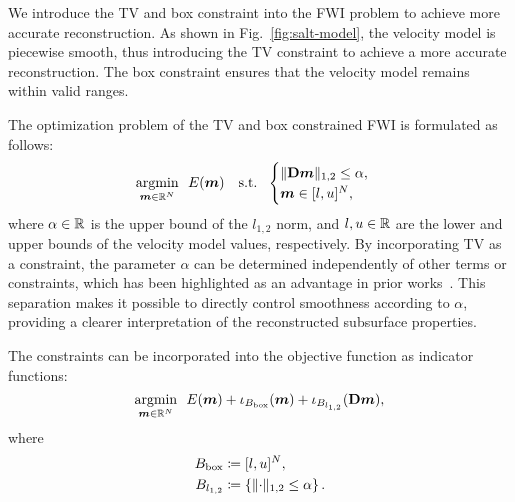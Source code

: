

We introduce the TV and box constraint into the FWI problem to achieve more accurate reconstruction.
As shown in Fig.~\ref{fig:salt-model}, the velocity model is piecewise smooth, thus introducing the TV constraint to achieve a more accurate reconstruction.
The box constraint ensures that the velocity model remains within valid ranges.

The optimization problem of the TV and box constrained FWI is formulated as follows:
\begin{equation} \label{eq:FWIObjectiveWithTVConstraint} \argmin{\velModel \in \realNumber^N} \ \ \FWIObjectiveWithTVConstraint \end{equation}
where $\alpha \in \mathbb{R}$ is the upper bound of the $l_{1,2}$ norm, and $l, u \in \mathbb{R}$ are the lower and upper bounds of the velocity model values, respectively.
By incorporating TV as a constraint, the parameter $\alpha$ can be determined independently of other terms or constraints, which has been highlighted as an advantage in prior works~\cite{constraint0,constraint1,constraint2,constraint3,constraint4,constraints-vs-penalties-in-FWI}.
This separation makes it possible to directly control smoothness according to $\alpha$, providing a clearer interpretation of the reconstructed subsurface properties.

The constraints can be incorporated into the objective function as indicator functions:
\begin{equation} \label{eq:FWIObjectiveWithTVConstraintWithIndicatorFunction} \argmin{\velModel \in \realNumber^N} \ \ \FWIObjectiveWithTVConstraintWithIndicatorFunction, \end{equation}
where
\begin{equation}
    \label{eq:LOneTwoBallDefinition}
    \begin{aligned}[b]
        \BoxBall & \coloneqq [l,u]^N, \\
        \LOneTwoBall & \coloneqq \LOneTwoBallSetDefinition.
    \end{aligned}
\end{equation}


